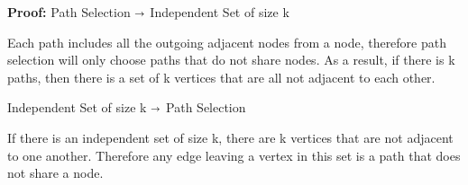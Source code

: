 \documentclass{article}
\begin{document}
\textbf{Proof:} Path Selection $\shortrightarrow$ Independent Set of size k

Each path includes all the outgoing adjacent nodes from a node, therefore path
selection will only choose paths that do not share nodes.  As a result, if there
is k paths, then there is a set of k vertices that are all not adjacent to each other.

Independent Set of size k $\shortrightarrow$ Path Selection

If there is an independent set of size k, there are k vertices that are not adjacent
to one another.  Therefore any edge leaving a vertex in this set is a path that
does not share a node.
\end{document}
